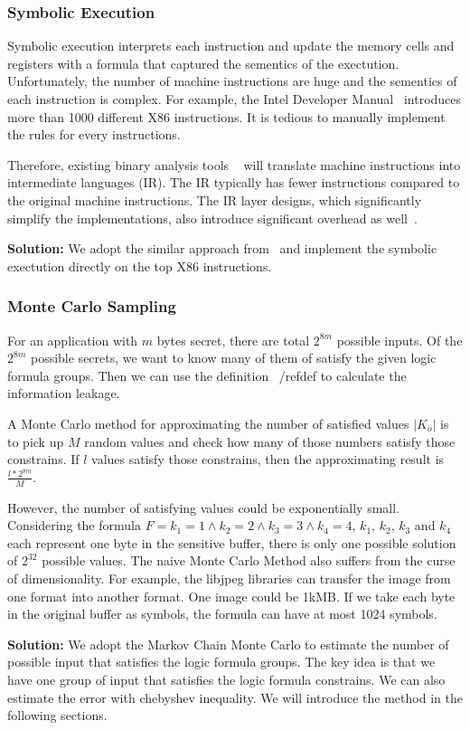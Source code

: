 \subsubsection{Symbolic Execution}
Symbolic execution interprets each instruction and update the memory cells and registers with a 
formula that captured the sementics of the exectution. Unfortunately, the number of machine instructions 
are huge and the sementics of each instruction is complex. For example, the Intel Developer Manual~\cite{intelsys}
introduces more than 1000 different X86 instructions. It is tedious to manually implement the
rules for every instructions.

Therefore, existing binary analysis tools ~\cite{shoshitaishvili2016state, 10.1007/978-3-642-22110-1_37} 
will translate machine instructions into intermediate languages (IR). The IR typically has fewer 
instructions compared to the original machine instructions. The IR layer designs, which significantly
simplify the implementations, also introduce significant overhead as well~\cite{217563}.

\textbf{Solution: }We adopt the similar approach from~\cite{217563} and implement the symbolic exectution 
directly on the top X86 instructions.

\subsubsection{Monte Carlo Sampling}
\label{MCreasons}
For an application with $m$ bytes secret, there are total $2^{8m}$ possible inputs. Of the
$2^{8m}$ possible secrets, we want to know many of them of satisfy the given logic formula groups.
Then we can use the definition ~/ref{def} to calculate the information leakage.

A Monte Carlo method for approximating the number of satisfied values $|K_o|$ is to pick up 
$M$ random values and check how many of those numbers satisfy those constrains. If $l$ values
satisfy those constrains, then the approximating result is $\frac{l*2^{8m}}{M}$.

However, the number of satisfying values could be exponentially small. Considering the formula
$F={k_1} = 1\land{k_2} = 2\land{k_3} = 3\land{k_4} = 4$, $k_1$, $k_2$, $k_3$ and $k_4$ each represent
one byte in the sensitive buffer, there is only one possible solution of $2^{32}$ possible
values. The naive Monte Carlo Method also suffers from the curse of dimensionality. For example, 
the libjpeg libraries can transfer the image from one format into another format. One image could
be 1kMB. If we take each byte in the original buffer as symbols, the formula can have at most
1024 symbols. 

\textbf{Solution: }We adopt the Markov Chain Monte Carlo to estimate the number of possible input
that satisfies the logic formula groups. The key idea is that we have one group of input that satisfies
the logic formula constrains. We can also estimate the error with chebyshev inequality. We will
introduce the method in the following sections.
